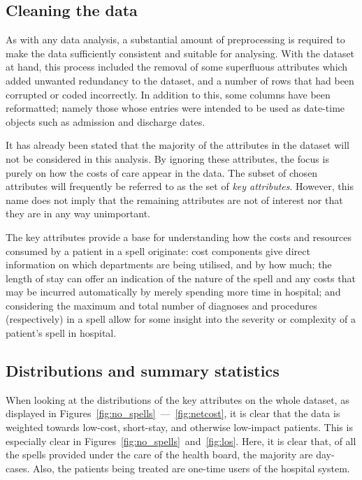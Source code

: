 \subsection{Cleaning the data}\label{subsec:formatting}

As with any data analysis, a substantial amount of preprocessing is required to
make the data sufficiently consistent and suitable for analysing. With the
dataset at hand, this process included the removal of some superfluous
attributes which added unwanted redundancy to the dataset, and a number of rows
that had been corrupted or coded incorrectly. In addition to this, some columns
have been reformatted; namely those whose entries were intended to be used as
date-time objects such as admission and discharge dates.

It has already been stated that the majority of the attributes in the dataset
will not be considered in this analysis. By ignoring these attributes, the focus
is purely on how the costs of care appear in the data. The subset of chosen
attributes will frequently be referred to as the set of \emph{key attributes}.
However, this name does not imply that the remaining attributes are not of
interest nor that they are in any way unimportant.

The key attributes provide a base for understanding how the costs and resources
consumed by a patient in a spell originate: cost components give direct
information on which departments are being utilised, and by how much; the length
of stay can offer an indication of the nature of the spell and any costs that
may be incurred automatically by merely spending more time in hospital; and
considering the maximum and total number of diagnoses and procedures
(respectively) in a spell allow for some insight into the severity or complexity
of a patient's spell in hospital.

\subsection{Distributions and summary statistics}%
\label{subsec:distributions_statistics}
\graphicspath{{chapters/data/paper/img/overview/}}

When looking at the distributions of the key attributes on the whole dataset, as
displayed in Figures~\ref{fig:no_spells}~---~\ref{fig:netcost}, it is clear that
the data is weighted towards low-cost, short-stay, and otherwise low-impact
patients. This is especially clear in
Figures~\ref{fig:no_spells}~and~\ref{fig:los}. Here, it is clear that, of all
the spells provided under the care of the health board, the majority are
day-cases. Also, the patients being treated are one-time users of the hospital
system.

